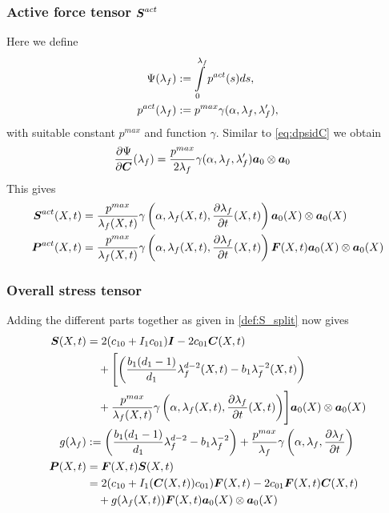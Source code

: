 \subsubsection{Active force tensor $\boldsymbol{S}^{act}$}
Here we define
\begin{align*}
	\Psi(\lambda_f) &:= \int\limits_{0}^{\lambda_f} p^{act}(s)ds,\\
	p^{act}(\lambda_f) &:= p^{max}\gamma(\alpha,\lambda_f,\lambda_f'),
\end{align*}
with suitable constant $p^{max}$ and function $\gamma$.
Similar to \eqref{eq:dpsidC} we obtain
\begin{align}
	\frac{\partial \Psi}{\partial \boldsymbol{C}}(\lambda_f) &= \frac{p^{max}}{2\lambda_f}\gamma(\alpha,\lambda_f,\lambda_f')\boldsymbol{a}_0\otimes\boldsymbol{a}_0
\end{align}
This gives
\begin{align}
	\boldsymbol{S}^{act}(X,t) &= \frac{p^{max}}{\lambda_f(X,t)}\gamma\left(\alpha,\lambda_f(X,t),\frac{\partial \lambda_f}{\partial t}(X,t)\right)\boldsymbol{a}_0(X)\otimes\boldsymbol{a}_0(X)\\
	\boldsymbol{P}^{act}(X,t) &= \frac{p^{max}}{\lambda_f(X,t)}\gamma\left(\alpha,\lambda_f(X,t),\frac{\partial \lambda_f}{\partial t}(X,t)\right)\boldsymbol{F}(X,t)\boldsymbol{a}_0(X)\otimes\boldsymbol{a}_0(X)
\end{align}

\subsubsection{Overall stress tensor}
Adding the different parts together as given in \eqref{def:S_split} now gives
\begin{align}
	\boldsymbol{S}(X,t) &= 2(c_{10} + I_1c_{01})\boldsymbol{I} - 2c_{01}\boldsymbol{C}(X,t)\\
			 &\quad+\Biggl[\left(\frac{b_1(d_1-1)}{d_1}\lambda_f^{d-2}(X,t) - b_1\lambda_f^{-2}(X,t)\right)\nonumber\\
			 &\quad+\frac{p^{max}}{\lambda_f(X,t)}\gamma\left(\alpha,\lambda_f(X,t),\frac{\partial \lambda_f}{\partial t}(X,t)\right)\Biggr]\boldsymbol{a}_0(X)\otimes\boldsymbol{a}_0(X)\nonumber\\
	g(\lambda_f)&:= \left(\frac{b_1(d_1-1)}{d_1}\lambda_f^{d-2} - b_1\lambda_f^{-2}\right)+\frac{p^{max}}{\lambda_f}\gamma\left(\alpha,\lambda_f,\frac{\partial \lambda_f}{\partial t}\right)\\			 
	\boldsymbol{P}(X,t) &= \boldsymbol{F}(X,t)\boldsymbol{S}(X,t)\label{def:completeP}\\
			 &= 2(c_{10} + I_1(\boldsymbol{C}(X,t))c_{01})\boldsymbol{F}(X,t) - 2c_{01}\boldsymbol{F}(X,t)\boldsymbol{C}(X,t)\nonumber\\
			 &\quad+g(\lambda_f(X,t))\boldsymbol{F}(X,t)\boldsymbol{a}_0(X)\otimes\boldsymbol{a}_0(X)\nonumber
\end{align}

